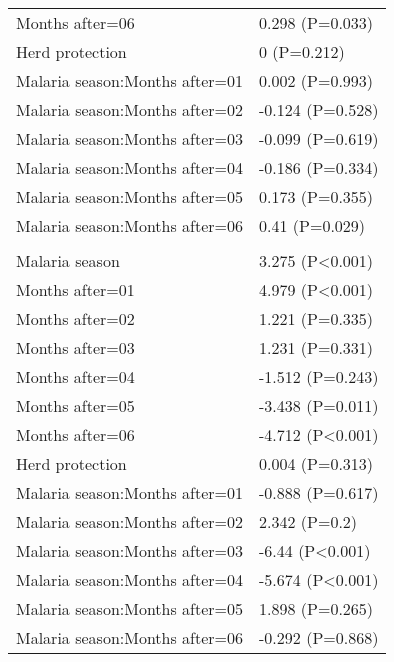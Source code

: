 \documentclass[]{article}
\begin{document}
\begin{longtable}[t]{ll}
\hspace{1em}Months after=06 & 0.298 (P=0.033)\\
\hspace{1em}Herd protection & 0 (P=0.212)\\
\hspace{1em}Malaria season:Months after=01 & 0.002 (P=0.993)\\
\hspace{1em}Malaria season:Months after=02 & -0.124 (P=0.528)\\
\hspace{1em}Malaria season:Months after=03 & -0.099 (P=0.619)\\
\hspace{1em}Malaria season:Months after=04 & -0.186 (P=0.334)\\
\hspace{1em}Malaria season:Months after=05 & 0.173 (P=0.355)\\
\hspace{1em}Malaria season:Months after=06 & 0.41 (P=0.029)\\
\addlinespace[1.5em]
\multicolumn{2}{l}{\textbf{Temporary not field worker}}\\
\hspace{1em}Malaria season & 3.275 (P<0.001)\\
\hspace{1em}Months after=01 & 4.979 (P<0.001)\\
\hspace{1em}Months after=02 & 1.221 (P=0.335)\\
\hspace{1em}Months after=03 & 1.231 (P=0.331)\\
\hspace{1em}Months after=04 & -1.512 (P=0.243)\\
\hspace{1em}Months after=05 & -3.438 (P=0.011)\\
\hspace{1em}Months after=06 & -4.712 (P<0.001)\\
\hspace{1em}Herd protection & 0.004 (P=0.313)\\
\hspace{1em}Malaria season:Months after=01 & -0.888 (P=0.617)\\
\hspace{1em}Malaria season:Months after=02 & 2.342 (P=0.2)\\
\hspace{1em}Malaria season:Months after=03 & -6.44 (P<0.001)\\
\hspace{1em}Malaria season:Months after=04 & -5.674 (P<0.001)\\
\hspace{1em}Malaria season:Months after=05 & 1.898 (P=0.265)\\
\hspace{1em}Malaria season:Months after=06 & -0.292 (P=0.868)\\*
\end{longtable}
\end{document}
